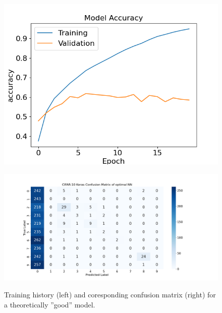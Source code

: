 \begin{figure}[H]
  \centering
  \begin{minipage}{.5\textwidth}
    \centering
    \includegraphics[width=1.0\linewidth]{img/training_history_optimal_err.png}
    \label{fig:training_history_optimal_err}
  \end{minipage}%
  \begin{minipage}{.5\textwidth}
    \centering
    \includegraphics[width=1.25\linewidth]{img/ConfusionMatrix_optimal_err.png}
    \label{fig:confusion_matrix_optimal_err}
  \end{minipage}
  \caption{Training history (left) and coresponding confusion matrix (right) for a theoretically ''good'' model.}
  \label{fig:confusion_matrix_overview_err}
\end{figure}